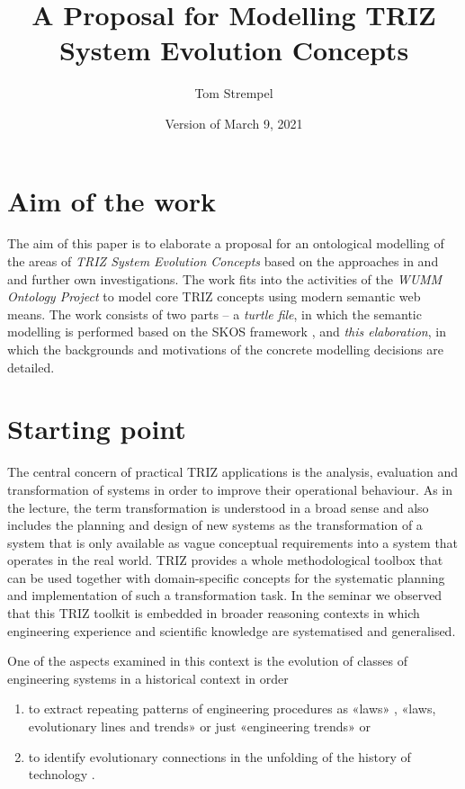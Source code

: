\documentclass[11pt,a4paper]{article}
\title{A Proposal for Modelling TRIZ System Evolution Concepts}
\author{Tom Strempel}
\date{Version of March 9, 2021}
\begin{document}
\maketitle

\section{Aim of the work}

The aim of this paper is to elaborate a proposal for an ontological modelling
of the areas of \emph{TRIZ System Evolution Concepts} based on the approaches
in \cite{TESE2018} and \cite{Shpakovsky2016} and further own investigations.
The work fits into the activities of the \emph{WUMM Ontology Project}
\cite{WUMM} to model core TRIZ concepts using modern semantic web means.  The
work consists of two parts -- a \emph{turtle file}, in which the semantic
modelling is performed based on the SKOS framework \cite{SKOS}, and \emph{this elaboration}, in which the backgrounds and motivations of the concrete
modelling decisions are detailed.

\section{Starting point} 

The central concern of practical TRIZ applications is the analysis, evaluation
and transformation of systems in order to improve their operational behaviour.
As in the lecture, the term transformation is understood in a broad sense and
also includes the planning and design of new systems as the transformation of
a system that is only available as vague conceptual requirements into a system
that operates in the real world. TRIZ provides a whole methodological toolbox
that can be used together with domain-specific concepts for the systematic
planning and implementation of such a transformation task. In the seminar we
observed that this TRIZ toolkit is embedded in broader reasoning contexts in
which engineering experience and scientific knowledge are systematised and
generalised.

One of the aspects examined in this context is the evolution of classes of
engineering systems in a historical context in order 
\begin{enumerate}
\item to extract repeating patterns of engineering procedures as «laws»
  \cite{Altshuller1979}, «laws, evolutionary lines and trends» \cite{KS} or
  just «engineering trends» \cite{TESE2018} or
\item to identify evolutionary connections in the unfolding of the history of
  technology \cite{Shpakovsky2016}.
\end{enumerate}
\end{document}
